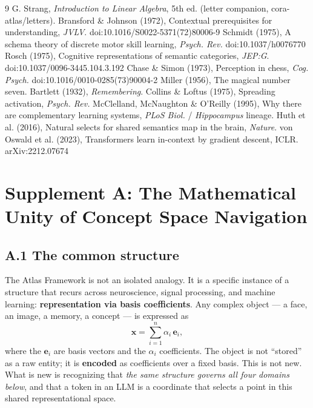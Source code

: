 \documentclass[12pt, a4paper]{article}
\begin{document}
\begin{thebibliography}{9}
 G. Strang, \emph{Introduction to Linear Algebra}, 5th ed. (letter companion, cora-atlas/letters).
 Bransford \& Johnson (1972), Contextual prerequisites for understanding, \emph{JVLV}. doi:10.1016/S0022-5371(72)80006-9
 Schmidt (1975), A schema theory of discrete motor skill learning, \emph{Psych. Rev.} doi:10.1037/h0076770
 Rosch (1975), Cognitive representations of semantic categories, \emph{JEP:G}. doi:10.1037/0096-3445.104.3.192
 Chase \& Simon (1973), Perception in chess, \emph{Cog. Psych.} doi:10.1016/0010-0285(73)90004-2
 Miller (1956), The magical number seven.
 Bartlett (1932), \emph{Remembering}.
 Collins \& Loftus (1975), Spreading activation, \emph{Psych. Rev.}
 McClelland, McNaughton \& O'Reilly (1995), Why there are complementary learning systems, \emph{PLoS Biol.} / \emph{Hippocampus} lineage.
 Huth et al. (2016), Natural selects for shared semantics map in the brain, \emph{Nature}.
 von Oswald et al. (2023), Transformers learn in-context by gradient descent, ICLR. arXiv:2212.07674
\end{thebibliography}

\clearpage
\appendix
\section*{Supplement A: The Mathematical Unity of Concept Space Navigation}

\subsection*{A.1 The common structure}
The Atlas Framework is not an isolated analogy. It is a specific instance of a structure that recurs across neuroscience, signal processing, and machine learning: \textbf{representation via basis coefficients}. Any complex object --- a face, an image, a memory, a concept --- is expressed as
\begin{equation}
\mathbf{x} = \sum_{i=1}^{n} \alpha_i\, \mathbf{e}_i ,
\end{equation}
where the $\mathbf{e}_i$ are basis vectors and the $\alpha_i$ coefficients. The object is not ``stored'' as a raw entity; it is \textbf{encoded} as coefficients over a fixed basis. This is not new. What is new is recognizing that \emph{the same structure governs all four domains below}, and that a token in an LLM is a coordinate that selects a point in this shared representational space.
\end{document}
